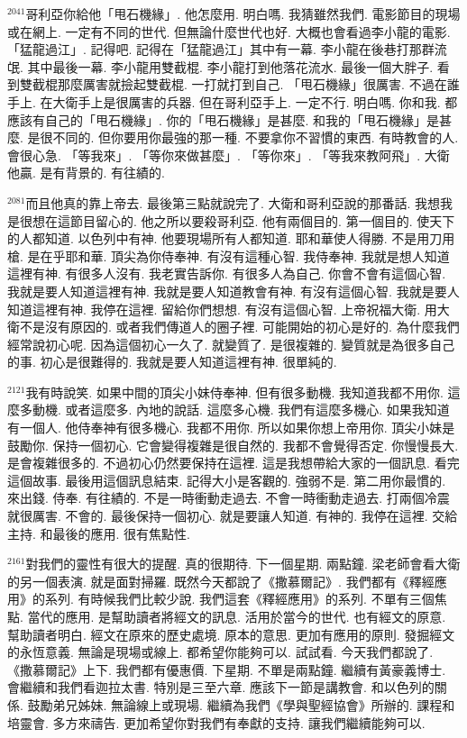 \documentclass{book}
\begin{document}
$^{2041}$哥利亞你給他「甩石機緣」.
他怎麼用.
明白嗎.
我猜雖然我們.
電影節目的現場或在網上.
一定有不同的世代.
但無論什麼世代也好.
大概也會看過李小龍的電影.
「猛龍過江」.
記得吧.
記得在「猛龍過江」其中有一幕.
李小龍在後巷打那群流氓.
其中最後一幕.
李小龍用雙截棍.
李小龍打到他落花流水.
最後一個大胖子.
看到雙截棍那麼厲害就撿起雙截棍.
一打就打到自己.
「甩石機緣」很厲害.
不過在誰手上.
在大衛手上是很厲害的兵器.
但在哥利亞手上.
一定不行.
明白嗎.
你和我.
都應該有自己的「甩石機緣」.
你的「甩石機緣」是甚麼.
和我的「甩石機緣」是甚麼.
是很不同的.
但你要用你最強的那一種.
不要拿你不習慣的東西.
有時教會的人.
會很心急.
「等我來」.
「等你來做甚麼」.
「等你來」.
「等我來教阿飛」.
大衛他贏.
是有背景的.
有往績的.

$^{2081}$而且他真的靠上帝去.
最後第三點就說完了.
大衛和哥利亞說的那番話.
我想我是很想在這節目留心的.
他之所以要殺哥利亞.
他有兩個目的.
第一個目的.
使天下的人都知道.
以色列中有神.
他要現場所有人都知道.
耶和華使人得勝.
不是用刀用槍.
是在乎耶和華.
頂尖為你侍奉神.
有沒有這種心智.
我侍奉神.
我就是想人知道這裡有神.
有很多人沒有.
我老實告訴你.
有很多人為自己.
你會不會有這個心智.
我就是要人知道這裡有神.
我就是要人知道教會有神.
有沒有這個心智.
我就是要人知道這裡有神.
我停在這裡.
留給你們想想.
有沒有這個心智.
上帝祝福大衛.
用大衛不是沒有原因的.
或者我們傳道人的圈子裡.
可能開始的初心是好的.
為什麼我們經常說初心呢.
因為這個初心一久了.
就變質了.
是很複雜的.
變質就是為很多自己的事.
初心是很難得的.
我就是要人知道這裡有神.
很單純的.

$^{2121}$我有時說笑.
如果中間的頂尖小妹侍奉神.
但有很多動機.
我知道我都不用你.
這麼多動機.
或者這麼多.
內地的說話.
這麼多心機.
我們有這麼多機心.
如果我知道有一個人.
他侍奉神有很多機心.
我都不用你.
所以如果你想上帝用你.
頂尖小妹是鼓勵你.
保持一個初心.
它會變得複雜是很自然的.
我都不會覺得否定.
你慢慢長大.
是會複雜很多的.
不過初心仍然要保持在這裡.
這是我想帶給大家的一個訊息.
看完這個故事.
最後用這個訊息結束.
記得大小是客觀的.
強弱不是.
第二用你最慣的.
來出錢.
侍奉.
有往績的.
不是一時衝動走過去.
不會一時衝動走過去.
打兩個冷震就很厲害.
不會的.
最後保持一個初心.
就是要讓人知道.
有神的.
我停在這裡.
交給主持.
和最後的應用.
很有焦點性.

$^{2161}$對我們的靈性有很大的提醒.
真的很期待.
下一個星期.
兩點鐘.
梁老師會看大衛的另一個表演.
就是面對掃羅.
既然今天都說了《撒慕爾記》.
我們都有《釋經應用》的系列.
有時候我們比較少說.
我們這套《釋經應用》的系列.
不單有三個焦點.
當代的應用.
是幫助讀者將經文的訊息.
活用於當今的世代.
也有經文的原意.
幫助讀者明白.
經文在原來的歷史處境.
原本的意思.
更加有應用的原則.
發掘經文的永恆意義.
無論是現場或線上.
都希望你能夠可以.
試試看.
今天我們都說了.
《撒慕爾記》上下.
我們都有優惠價.
下星期.
不單是兩點鐘.
繼續有黃豪義博士.
會繼續和我們看迦拉太書.
特別是三至六章.
應該下一節是講教會.
和以色列的關係.
鼓勵弟兄姊妹.
無論線上或現場.
繼續為我們《學與聖經協會》所辦的.
課程和培靈會.
多方來禱告.
更加希望你對我們有奉獻的支持.
讓我們繼續能夠可以.
\end{document}
